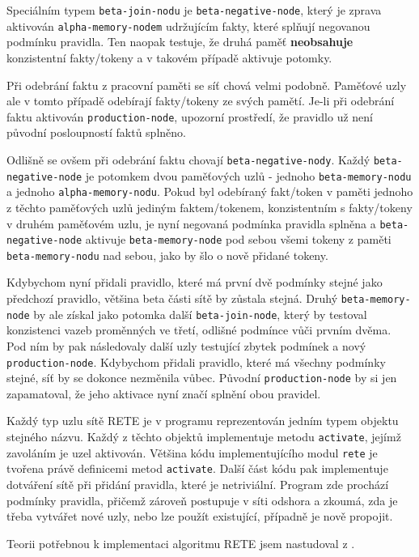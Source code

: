 Speciálním typem \verb|beta-join-nodu| je \verb|beta-negative-node|, který je
zprava aktivován \verb|alpha-memory-nodem| udržujícím fakty, které splňují
negovanou podmínku pravidla. Ten naopak testuje, že druhá paměť
\textbf{neobsahuje} konzistentní fakty/tokeny a v takovém případě aktivuje
potomky.

Při odebrání faktu z pracovní paměti se síť chová velmi podobně. Paměťové uzly
ale v tomto případě odebírají fakty/tokeny ze svých pamětí.
Je-li při odebrání faktu aktivován \verb|production-node|, upozorní prostředí,
že pravidlo už není původní posloupností faktů splněno.

Odlišně se ovšem při odebrání faktu chovají \verb|beta-negative-nody|. Každý
\verb|beta-negative-node| je potomkem dvou paměťových uzlů - jednoho
\verb|beta-memory-nodu| a jednoho \verb|alpha-memory-nodu|. Pokud byl odebíraný
fakt/token v paměti jednoho z těchto paměťových uzlů jediným faktem/tokenem,
konzistentním s fakty/tokeny v druhém paměťovém uzlu, je nyní negovaná podmínka
pravidla splněna a \verb|beta-negative-node| aktivuje \verb|beta-memory-node|
pod sebou všemi tokeny z paměti \verb|beta-memory-nodu| nad sebou, jako by šlo o
nově přidané tokeny.

Kdybychom nyní přidali pravidlo, které má první dvě podmínky stejné jako
předchozí pravidlo, většina beta části sítě by zůstala stejná. Druhý
\verb|beta-memory-node| by ale získal jako potomka další \verb|beta-join-node|,
který by testoval konzistenci vazeb proměnných ve třetí, odlišné podmínce vůči
prvním dvěma. Pod ním by pak následovaly další uzly testující zbytek podmínek a
nový \verb|production-node|. Kdybychom přidali pravidlo, které má všechny
podmínky stejné, síť by se dokonce nezměnila vůbec. Původní
\verb|production-node| by si jen zapamatoval, že jeho aktivace nyní značí
splnění obou pravidel.

Každý typ uzlu sítě RETE je v programu reprezentován jedním typem objektu
stejného názvu. Každý z těchto objektů implementuje metodu \verb|activate|,
jejímž zavoláním je uzel aktivován. Většina kódu implementujícího modul
\verb|rete| je tvořena právě definicemi metod \verb|activate|. Další část kódu
pak implementuje dotváření sítě při přidání pravidla, které je netriviální.
Program zde prochází podmínky pravidla, přičemž zároveň postupuje v síti odshora
a zkoumá, zda je třeba vytvářet nové uzly, nebo lze použít existující, případně
je nově propojit.

Teorii potřebnou k implementaci algoritmu RETE jsem nastudoval z \cite{doorenbos}.
